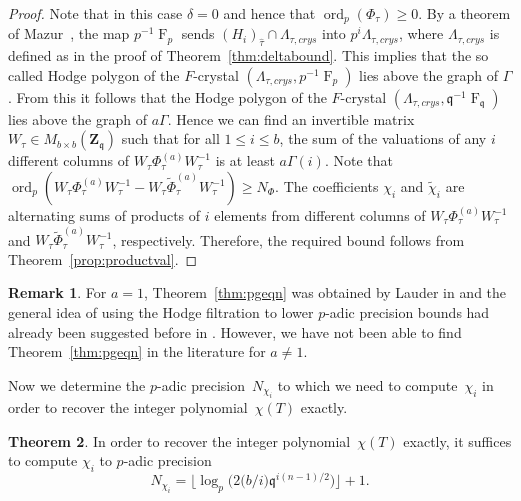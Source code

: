 \documentclass[a4paper,11pt]{article}
\numberwithin{equation}{section}
\providecommand{\floorbig}[1]{\bigl\lfloor#1\bigr\rfloor} %
\newcommand{\ZZ}{\mathbf{Z}} %
\DeclareMathOperator{\ord}{ord}          %
\DeclareMathOperator{\Frob}{F}           %
\theoremstyle{definition}
\newtheorem{thm}{Theorem}[section]
\newtheorem{rem}[thm]{Remark}
\begin{document}
\begin{proof} 
Note that in this case $\delta=0$ and hence that $\ord_p(\Phi_{\tau}) \geq 0$. 
By a theorem of Mazur~\citep{Mazur1972}, the map $p^{-1} \Frob_p$ 
sends $(H_i)_{\hat{\tau}} \cap \Lambda_{\tau,crys}$ into $p^i \Lambda_{\tau,crys}$, 
where $\Lambda_{\tau,crys}$ is defined as in the proof of 
Theorem~\ref{thm:deltabound}. This implies that the so called Hodge polygon 
of the $F$-crystal $(\Lambda_{\tau,crys},p^{-1} \Frob_p)$ lies above the graph of 
$\Gamma$. From this it follows that the Hodge polygon of the $F$-crystal 
$(\Lambda_{\tau,crys},\mathfrak{q}^{-1} \Frob_{\mathfrak{q}})$ lies
above the graph of $a\Gamma$. Hence we can find an invertible matrix 
$W_{\tau} \in M_{b \times b}(\ZZ_{\mathfrak{q}})$ such that for all 
$1 \leq i \leq b$, the sum of the valuations of any $i$ different columns
of $W_{\tau} \Phi_{\tau}^{(a)} W_{\tau}^{-1}$ is at least $a\Gamma(i)$.
Note that 
$\ord_p(W_{\tau }\Phi_{\tau}^{(a)} W_{\tau}^{-1}-W_{\tau } \tilde{\Phi}_{\tau}^{(a)} W_{\tau}^{-1}) \geq N_{\Phi}$.
The coefficients $\chi_i$ and $\tilde{\chi}_i$ are alternating sums 
of products of $i$ elements from different columns of 
$W_{\tau }\Phi_{\tau}^{(a)} W_{\tau}^{-1}$ 
and $W_{\tau } \tilde{\Phi}_{\tau}^{(a)} W_{\tau}^{-1}$, respectively.  
Therefore, the required bound follows from Theorem~\ref{prop:productval}. 
\end{proof}

\begin{rem}
For $a=1$, Theorem~\ref{thm:pgeqn} was obtained by Lauder in \citep[Proposition 9.4]{Lauder2006} and
the general idea of using the Hodge filtration to lower $p$-adic precision bounds had already been 
suggested before in \citep[Remark 1.6.4]{AbbottKedlayaRoe2006}. However, we have not been able
to find Theorem~\ref{thm:pgeqn} in the literature for $a \neq 1$. 
\end{rem}

Now we determine the $p$-adic precision~$N_{\chi_i}$ to which we need to compute~$\chi_i$ 
in order to recover the integer polynomial~$\chi(T)$ exactly.

\begin{thm} \label{thm:N0}
In order to recover the integer polynomial~$\chi(T)$ exactly, 
it suffices to compute $\chi_i$ to $p$-adic precision 
\begin{equation*}
N_{\chi_i} = \floorbig{\log_p \bigl( 2 \bigl( b/i \bigr) \mathfrak{q}^{i (n-1) / 2} \bigr)} + 1.
\end{equation*}
\end{thm}
\end{document}
